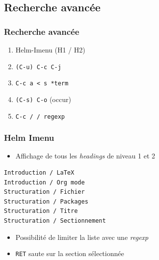 \documentclass[presentation,t,hideothersubsections]{beamer}
\begin{document}
\subsection{Recherche avancée}
\label{sec-5-6}
\begin{frame}
\frametitle{Recherche avancée}
\label{sec-5-6-1}


\begin{enumerate}
\item Helm-Imenu (H1 / H2)
\item \texttt{(C-u) C-c C-j}
\item \texttt{C-c a < s *term}
\item \texttt{(C-s) C-o} (occur)
\item \texttt{C-c / / regexp}
\end{enumerate}
\end{frame}
\begin{frame}[fragile]
\frametitle{Helm Imenu}
\label{sec-5-6-2}


\begin{itemize}
\item Affichage de tous les \emph{headings} de niveau 1 et 2
\end{itemize}


\lstset{language=org}
\begin{lstlisting}
Introduction / LaTeX
Introduction / Org mode
Structuration / Fichier
Structuration / Packages
Structuration / Titre
Structuration / Sectionnement
\end{lstlisting}

\begin{itemize}
\item Possibilité de limiter la liste avec une \emph{regexp}
\item \texttt{RET} saute sur la section sélectionnée
\end{itemize}
\end{frame}
\end{document}
